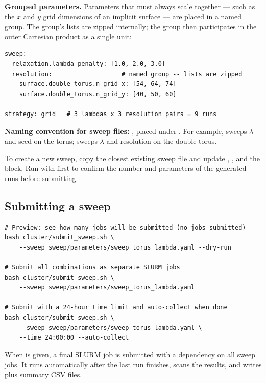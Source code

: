 \documentclass[11pt,a4paper]{article}
\begin{document}
\textbf{Grouped parameters.}  Parameters that must always scale together
--- such as the $x$ and $y$ grid dimensions of an implicit surface ---
are placed in a named group.  The group's lists are zipped internally;
the group then participates in the outer Cartesian product as a single
unit:

\begin{lstlisting}[style=shell]
sweep:
  relaxation.lambda_penalty: [1.0, 2.0, 3.0]
  resolution:                   # named group -- lists are zipped
    surface.double_torus.n_grid_x: [54, 64, 74]
    surface.double_torus.n_grid_y: [40, 50, 60]

strategy: grid   # 3 lambdas x 3 resolution pairs = 9 runs
\end{lstlisting}

\textbf{Naming convention for sweep files:}
, placed under
.  For example,
 sweeps $\lambda$ and seed on the torus;
 sweeps $\lambda$ and resolution
on the double torus.

\begin{tipbox}
To create a new sweep, copy the closest existing sweep file and update
, , and the  block.  Run
with  first to confirm the number and parameters of the
generated runs before submitting.
\end{tipbox}

\subsection{Submitting a sweep}

\begin{lstlisting}[style=shell]
# Preview: see how many jobs will be submitted (no jobs submitted)
bash cluster/submit_sweep.sh \
    --sweep sweep/parameters/sweep_torus_lambda.yaml --dry-run

# Submit all combinations as separate SLURM jobs
bash cluster/submit_sweep.sh \
    --sweep sweep/parameters/sweep_torus_lambda.yaml

# Submit with a 24-hour time limit and auto-collect when done
bash cluster/submit_sweep.sh \
    --sweep sweep/parameters/sweep_torus_lambda.yaml \
    --time 24:00:00 --auto-collect
\end{lstlisting}

When \code{--auto-collect} is given, a final SLURM job is submitted with
a dependency on all sweep jobs.  It runs automatically after the last run
finishes, scans the results, and writes  plus
summary CSV files.
\end{document}
